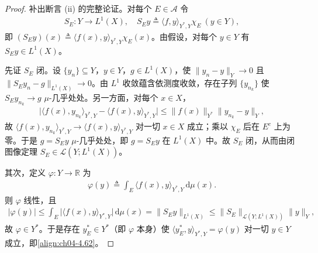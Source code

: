 \documentclass[../../main.tex]{subfiles}%
\begin{document}
\begin{proof}
补出断言 (ii) 的完整论证。对每个 $E\in\mathcal{A}$ 令
\begin{align*}
S_E:Y\to L^1(X),\quad S_Ey\triangleq \langle f,y\rangle_{Y^*,Y}\chi_E\ (y\in Y),
\end{align*}
即 $(S_Ey)(x)\triangleq\langle f(x),y\rangle_{Y^*,Y}\chi_E(x)$。由假设，对每个 $y\in Y$ 有 $S_Ey\in L^1(X)$。

先证 $S_E$ 闭。设 $\{y_n\}\subseteq Y$，$y\in Y$，$g\in L^1(X)$，使 $\|y_n-y\|_Y\to0$ 且 $\|S_Ey_n-g\|_{L^1(X)}\to0$。由 $L^1$ 收敛蕴含依测度收敛，存在子列 $\{y_{n_k}\}$ 使 $S_Ey_{n_k}\to g$ $\mu$-几乎处处。另一方面，对每个 $x\in X$，
\begin{align*}
\big|\langle f(x),y_{n_k}\rangle_{Y^*,Y}-\langle f(x),y\rangle_{Y^*,Y}\big|\leqslant\|f(x)\|_{Y^*}\|y_{n_k}-y\|_Y,
\end{align*}
故 $\langle f(x),y_{n_k}\rangle_{Y^*,Y}\to\langle f(x),y\rangle_{Y^*,Y}$ 对一切 $x\in X$ 成立；乘以 $\chi_E$ 后在 $E^c$ 上为零。于是 $g=S_Ey$ $\mu$-几乎处处，即 $g=S_Ey$ 在 $L^1(X)$ 中。故 $S_E$ 闭，从而由闭图像定理 $S_E\in\mathcal{L}(Y;L^1(X))$。

其次，定义 $\varphi:Y\to\mathbb{R}$ 为
\begin{align*}
\varphi(y)\triangleq\int_E\langle f(x),y\rangle_{Y^*,Y}\,\mathrm{d}\mu(x).
\end{align*}
则 $\varphi$ 线性，且
\begin{align*}
|\varphi(y)|\leqslant\int_E\big|\langle f(x),y\rangle_{Y^*,Y}\big|\,\mathrm{d}\mu(x)=\|S_Ey\|_{L^1(X)}\leqslant\|S_E\|_{\mathcal{L}(Y;L^1(X))}\|y\|_Y,
\end{align*}
故 $\varphi\in Y^*$。于是存在 $y_E^*\in Y^*$（即 $\varphi$ 本身）使 $\langle y_E^*,y\rangle_{Y^*,Y}=\varphi(y)$ 对一切 $y\in Y$ 成立，即\eqref{align:ch04-4.62}。
\end{proof}
\end{document}
